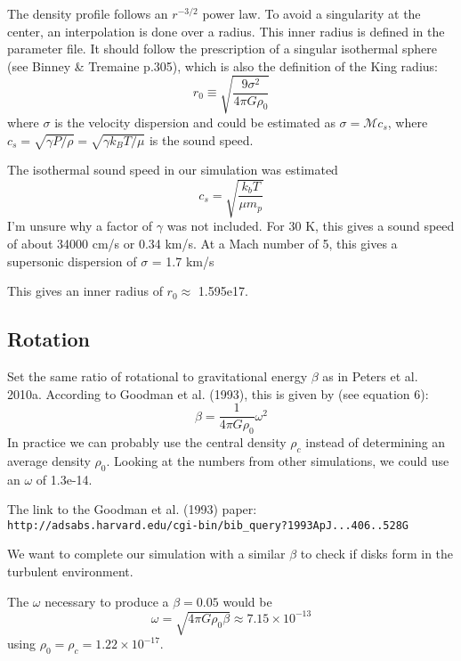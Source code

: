 \documentclass[a4paper]{tufte-handout}
\begin{document}
The density profile follows an $r^{-3/2}$ power law. To avoid a singularity at the center, an interpolation is done over a radius. This inner radius is defined in the parameter file. It should follow the prescription of a singular isothermal sphere (see Binney \& Tremaine p.305), which is also the definition of the King radius:
\begin{equation}
  r_0 \equiv \sqrt{\frac{9\sigma^2}{4\pi G\rho_0}}
\end{equation}
where $\sigma$ is the velocity dispersion and could be estimated as $\sigma = \mathcal{M} c_s$, where $c_s = \sqrt{\gamma P/\rho} = \sqrt{\gamma k_B T / \mu}$ is the sound speed.

The isothermal sound speed in our simulation was estimated
\begin{equation}
  c_s = \sqrt{\frac{k_b T}{\mu m_p}}
\end{equation}
I'm unsure why a factor of $\gamma$ was not included. For 30 K, this gives a sound speed of about 34000 cm/s or 0.34 km/s. At a Mach number of 5, this gives a supersonic dispersion of $\sigma$ = 1.7 km/s

This gives an inner radius of $r_0 \approx$ 1.595e17.

\subsection*{Rotation}

Set the same ratio of rotational to gravitational energy $\beta$ as in Peters et al. 2010a. According to Goodman et al. (1993), this is given by (see equation 6):
\begin{equation}
  \beta = \frac{1}{4 \pi G \rho_0} \omega^2
\end{equation}
In practice we can probably use the central density $\rho_c$ instead of determining an average density $\rho_0$. Looking at the numbers from other simulations, we could use an $\omega$ of 1.3e-14.

The link to the Goodman et al. (1993) paper:\\
{\tt http://adsabs.harvard.edu/cgi-bin/bib\_query?1993ApJ...406..528G}

We want to complete our simulation with a similar $\beta$ to check if disks form in the turbulent environment.

The $\omega$ necessary to produce a $\beta = 0.05$ would be
\begin{equation}
  \omega = \sqrt{4 \pi G \rho_0 \beta} \approx 7.15\times 10^{-13}
\end{equation}
using $\rho_0 = \rho_c = 1.22\times10^{-17}$.
\end{document}
